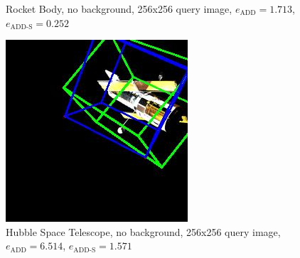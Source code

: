 \begin{figure}[h]
\begin{minipage}{0.45\linewidth}
        \caption{Rocket Body, no background, 256x256 query image, $e_\mathrm{ADD}=1.713$, $e_{\mathrm{ADD}\text{-}\mathrm{S}}=0.252$ }
        \label{fig:fig6}
    \end{minipage}
\end{figure}

\newpage

\begin{figure}[h]
    \centering
    \begin{minipage}{0.45\linewidth}
        \centering
        \includegraphics[width=\linewidth]{data/fig7.jpg} %
        \caption{Hubble Space Telescope, no background, 256x256 query image, $e_\mathrm{ADD}=6.514$, $e_{\mathrm{ADD}\text{-}\mathrm{S}}=1.571$ }
        \label{fig:fig7}
    \end{minipage}\hfill
    \begin{minipage}{0.45\linewidth}
        \centering

\end{minipage}
\end{figure}
